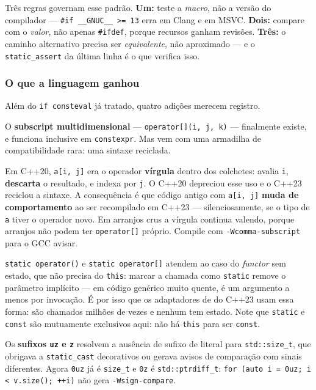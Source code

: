 Três regras governam esse padrão. \textbf{Um:} teste a \emph{macro}, não a
versão do compilador --- \texttt{\#if \_\_GNUC\_\_ >= 13} erra em Clang e em
MSVC. \textbf{Dois:} compare com o \emph{valor}, não apenas \texttt{\#ifdef},
porque recursos ganham revisões. \textbf{Três:} o caminho alternativo precisa
ser \emph{equivalente}, não aproximado --- e o \texttt{static\_assert} da última
linha é o que verifica isso.

\subsubsection{O que a linguagem ganhou}

Além do \texttt{if consteval} já tratado, quatro adições merecem registro.

O \textbf{subscript multidimensional} --- \texttt{operator[](i, j, k)} ---
finalmente existe, e funciona inclusive em \texttt{constexpr}. Mas vem com uma
armadilha de compatibilidade rara: uma sintaxe reciclada.

\begin{armadilha}
Em C++20, \texttt{a[i, j]} era o operador \textbf{vírgula} dentro dos colchetes:
avalia \texttt{i}, \textbf{descarta} o resultado, e indexa por \texttt{j}. O
C++20 depreciou esse uso e o C++23 reciclou a sintaxe. A consequência é que
código antigo com \texttt{a[i, j]} \textbf{muda de comportamento} ao ser
recompilado em C++23 --- silenciosamente, se o tipo de \texttt{a} tiver o
operador novo. Em arranjos crus a vírgula continua valendo, porque arranjos não
podem ter \texttt{operator[]} próprio. Compile com \texttt{-Wcomma-subscript}
para o GCC avisar.
\end{armadilha}

\texttt{static operator()} e \texttt{static operator[]} atendem ao caso do
\emph{functor} sem estado, que não precisa do \texttt{this}: marcar a chamada
como \texttt{static} remove o parâmetro implícito --- em código genérico muito
quente, é um argumento a menos por invocação. É por isso que os adaptadores de
 do C++23 usam essa forma: são chamados milhões de vezes e
nenhum tem estado. Note que \texttt{static} e \texttt{const} são mutuamente
exclusivos aqui: não há \texttt{this} para ser \texttt{const}.

Os \textbf{sufixos \texttt{uz} e \texttt{z}} resolvem a ausência de sufixo de
literal para \texttt{std::size\_t}, que obrigava a \texttt{static\_cast}
decorativos ou gerava avisos de comparação com sinais diferentes. Agora
\texttt{0uz} já é \texttt{size\_t} e \texttt{0z} é \texttt{std::ptrdiff\_t}:
\texttt{for (auto i = 0uz; i < v.size(); ++i)} não gera
\texttt{-Wsign-compare}.

